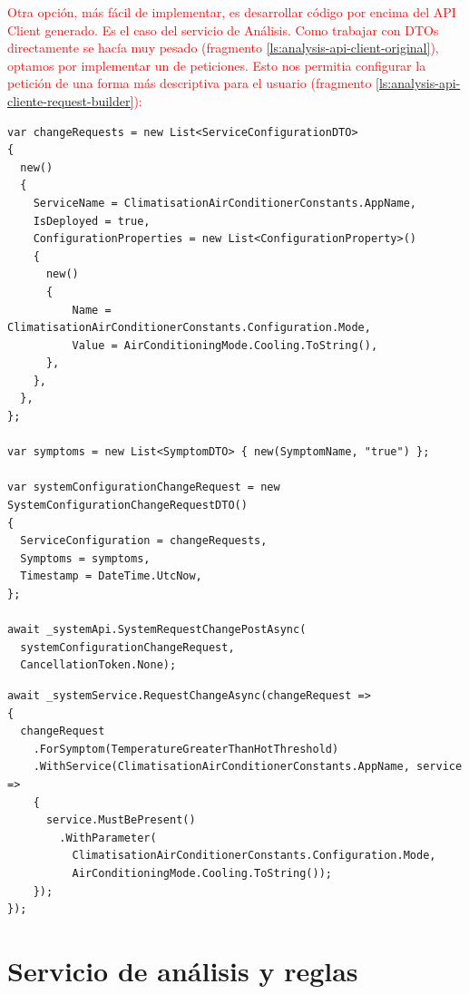 \textcolor{red}{Otra opción, más fácil de implementar, es desarrollar código por encima del API Client generado. Es el caso del servicio de Análisis. Como trabajar con DTOs directamente se hacía muy pesado (fragmento \ref{ls:analysis-api-client-original}), optamos por implementar un  de peticiones. Esto nos permitia configurar la petición de una forma más descriptiva para el usuario (fragmento \ref{ls:analysis-api-cliente-request-builder}):}

\begin{lstlisting}[language={[Sharp]C},caption={Implementación de petición original. Trabajar con DTOs era muy verboso.},captionpos=b, label=ls:analysis-api-client-original]
var changeRequests = new List<ServiceConfigurationDTO>
{
  new()
  {
    ServiceName = ClimatisationAirConditionerConstants.AppName,
    IsDeployed = true,
    ConfigurationProperties = new List<ConfigurationProperty>()
    {
      new()
      {
          Name = ClimatisationAirConditionerConstants.Configuration.Mode,
          Value = AirConditioningMode.Cooling.ToString(),
      },
    },
  },
};

var symptoms = new List<SymptomDTO> { new(SymptomName, "true") };

var systemConfigurationChangeRequest = new SystemConfigurationChangeRequestDTO()
{
  ServiceConfiguration = changeRequests,
  Symptoms = symptoms,
  Timestamp = DateTime.UtcNow,
};

await _systemApi.SystemRequestChangePostAsync(
  systemConfigurationChangeRequest,
  CancellationToken.None);
\end{lstlisting}


\begin{lstlisting}[language={[Sharp]C},caption={Implementación de la misma petición siguiendo el patrón \emph{builder}.},captionpos=b, label=ls:analysis-api-cliente-request-builder]
await _systemService.RequestChangeAsync(changeRequest =>
{
  changeRequest
    .ForSymptom(TemperatureGreaterThanHotThreshold)
    .WithService(ClimatisationAirConditionerConstants.AppName, service =>
    {
      service.MustBePresent()
        .WithParameter(
          ClimatisationAirConditionerConstants.Configuration.Mode,
          AirConditioningMode.Cooling.ToString());
    });
});
\end{lstlisting}


\section{Servicio de análisis y reglas}
\label{sec:implementacion-modulo-reglas}

